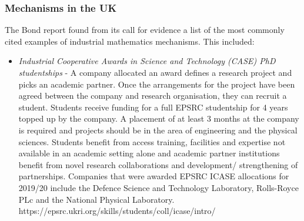 \documentclass[11pt]{article} %
\begin{document}
	\subsubsection{ Mechanisms in the UK  }
	
	The Bond report \cite{Bond} found from its call for evidence a list of the most commonly cited examples of industrial mathematics mechanisms. This included: 
	\begin{itemize}
		\item \textit{Industrial Cooperative Awards in Science and Technology (CASE) PhD studentships }- A company allocated an award defines a research project and picks an academic partner. Once the arrangements for the project have been agreed between the company and research organisation, they can recruit a student. Students receive funding for a full EPSRC studentship for 4 years topped up by the company. A placement of at least 3 months at the company is required and projects should be in the area of engineering and the physical sciences. Students benefit from access training, facilities and expertise not available in an academic setting alone and academic partner institutions benefit from novel research collaborations and  development/ strengthening  of partnerships. Companies that were awarded EPSRC ICASE allocations for 2019/20 include the Defence Science and Technology Laboratory, Rolls-Royce PLc and the National Physical Laboratory. https://epsrc.ukri.org/skills/students/coll/icase/intro/
		

\end{itemize}
\end{document}
